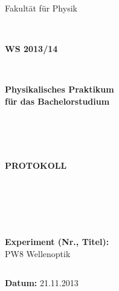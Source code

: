 \documentclass[12pt,a4paper]{article}
\begin{document}
%
%

%




\thispagestyle{empty}
			\begin{center}
			\Large{Fakultät für Physik}\\
			\end{center}
\begin{verbatim}


\end{verbatim}
			\begin{center}
			\textbf{\LARGE WS 2013/14}
			\end{center}
\begin{verbatim}


\end{verbatim}
			\begin{center}
			\textbf{\LARGE{Physikalisches Praktikum\\ für das Bachelorstudium}}
			\end{center}
\begin{verbatim}




\end{verbatim}

			\begin{center}
			\textbf{\LARGE{PROTOKOLL}}
			\end{center}
			
\begin{verbatim}





\end{verbatim}

			\begin{flushleft}
			\textbf{\Large{Experiment (Nr., Titel):}}\\
			\LARGE{PW8 Wellenoptik}	
			\end{flushleft}

\begin{verbatim}

\end{verbatim}	
			\begin{flushleft}
			\textbf{\Large{Datum:}} \Large{21.11.2013}
			\end{flushleft}
			
\end{document}
